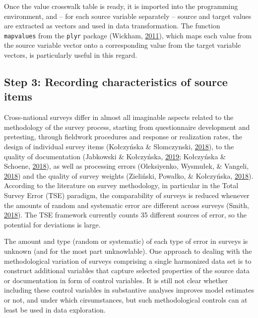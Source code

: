 \documentclass[12pt,]{article}
\begin{document}
Once the value crosswalk table is ready, it is imported into the programming environment, and -- for each source variable separately -- source and target values are extracted as vectors and used in data transformation. The function \texttt{mapvalues} from the \texttt{plyr} package (Wickham, \protect\hyperlink{ref-Wickham2011}{2011}), which maps each value from the source variable vector onto a corresponding value from the target variable vectors, is particularly useful in this regard.

\hypertarget{step-3-recording-characteristics-of-source-items}{%
\subsection{Step 3: Recording characteristics of source items}\label{step-3-recording-characteristics-of-source-items}}

Cross-national surveys differ in almost all imaginable aspects related to the methodology of the survey process, starting from questionnaire development and pretesting, through fieldwork procedures and response or realization rates, the design of individual survey items (Kołczyńska \& Slomczynski, \protect\hyperlink{ref-KolczynskaSlomczynski2018}{2018}), to the quality of documentation (Jabkowski \& Kołczyńska, \protect\hyperlink{ref-Jabkowski2019}{2019}; Kołczyńska \& Schoene, \protect\hyperlink{ref-KolczynskaSchoene2018}{2018}), as well as processing errors (Oleksiyenko, Wysmułek, \& Vangeli, \protect\hyperlink{ref-Oleksiyenko2018}{2018}) and the quality of survey weights (Zieliński, Powałko, \& Kołczyńska, \protect\hyperlink{ref-Zielinski2018}{2018}). According to the literature on survey methodology, in particular in the Total Survey Error (TSE) paradigm, the comparability of surveys is reduced whenever the amounts of random and systematic error are different across surveys (Smith, \protect\hyperlink{ref-Smith2018}{2018}). The TSE framework currently counts 35 different sources of error, so the potential for deviations is large.

The amount and type (random or systematic) of each type of error in surveys is unknown (and for the most part unknowlable). One approach to dealing with the methodological variation of surveys comprising a single harmonized data set is to construct additional variables that capture selected properties of the source data or documentation in form of control variables. It is still not clear whether including these control variables in substantive analyses improves model estimates or not, and under which cirsumstances, but such methodological controls can at least be used in data exploration.
\end{document}
